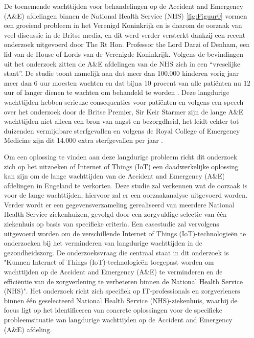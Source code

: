 
De toenemende wachttijden voor behandelingen op de Accident and Emergency (A\&E) afdelingen binnen de National Health Service (NHS) \ref{fig:Figuur0} vormen een groeiend probleem in het Verenigd Koninkrijk en is daarom de oorzaak van veel discussie in de Britse media, en dit werd verder versterkt dankzij een recent onderzoek uitgevoerd door The Rt Hon. Professor the Lord Darzi of Denham, een lid van de House of Lords van de Verenigde Koninkrijk. Volgens de bevindingen uit het onderzoek zitten de A\&E afdelingen van de NHS zich in een “vreselijke staat”. De studie toont namelijk aan dat meer dan 100.000 kinderen vorig jaar meer dan 6 uur moesten wachten en dat bijna 10 procent van alle patiënten nu 12 uur of langer dienen te wachten om behandeld te worden \autocite{LordDarzi2024}. Deze langdurige wachttijden hebben serieuze consequenties voor patiënten en volgens een speech over het onderzoek door de Britse Premier, Sir Keir Starmer zijn de lange A\&E wachttijden niet alleen een bron van angst en bezorgdheid, het leidt echter tot duizenden vermijdbare sterfgevallen en volgens de Royal College of Emergency Medicine zijn dit 14.000 extra sterfgevallen per jaar \autocite{Starmer2024}.

Om een oplossing te vinden aan deze langdurige probleem richt dit onderzoek zich op het uitzoeken of Internet of Things (IoT) een daadwerkelijke oplossing kan zijn om de lange wachttijden van de Accident and Emergency (A\&E) afdelingen in Engeland te verkorten. Deze studie zal verkennen wat de oorzaak is voor de lange wachttijden, hiervoor zal er een oorzaakanalyse uitgevoerd worden. Verder wordt er een gegevensverzameling gerealiseerd van meerdere Na\-tio\-nal Health Ser\-vice zie\-ken\-hui\-zen, gevolgd door een zorgvuldige selectie van één ziekenhuis op basis van specifieke criteria. Een casestudie zal vervolgens uitgevoerd worden om de verschillende In\-ter\-net of Things (IoT)-tech\-no\-lo\-gieën te onderzoeken bij het verminderen van langdurige wachttijden in de gezondheidszorg. De onderzoeksvraag die centraal staat in dit onderzoek is "Kunnen Inter\-net of Things (IoT)-tech\-no\-lo\-gieën toegepast worden om wachttijden op de Accident and Emergency (A\&E) te verminderen en de efficiëntie van de zorgverlening te verbeteren binnen de National Health Service (NHS)". Het onderzoek richt zich specifiek op IT-professionals en zorgverleners binnen één geselecteerd National Health Service (NHS)-ziekenhuis, waarbij de focus ligt op het identificeren van concrete oplossingen voor de specifieke probleemsituatie van langdurige wachttijden op de Accident and Emergency (A\&E) afdeling. 

